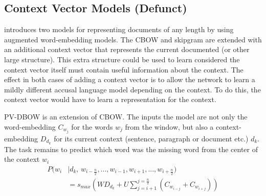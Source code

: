 \documentclass[12pt,parskip]{komatufte}
\begin{document}
\subsection{Context Vector Models (Defunct)}



 introduces two models for representing documents of any length by using augmented word-embedding models.
The CBOW and skipgram are extended with an additional context vector that represents the current documented (or other large structure).
This extra structure could be used to learn 
\textcite{le2014distributed} considered the context vector itself must contain useful information about the context.
The effect in both cases of adding a context vector is to allow the network to learn a mildly different accusal language model depending on the context.
To do this, the context vector would have to learn a representation for the context.

PV-DBOW is an extension of CBOW.
The inputs the model are not only the word-embedding $C_{w_j}$ for the words $w_j$ from the window,
but also a context-embedding $D_{d_k}$ for its current context (sentence, paragraph or document etc.) $d_k$.
The task remains to predict which word was the missing word from the center of the context $w_i$
\begin{align}
P(w_i & \mid d_k,\, w_{i-\frac{n}{2}},..., w_{i-1}, w_{i+1},...,w_{i+\frac{n}{2}})  \nonumber
\\  & = s_{max}(WD_{d_k} + U \sum_{j=i+1}^{j=\frac{n}{2}} \left( C_{w_{i-j}}+C_{w_{i+j}} \right))
\end{align}
\end{document}
